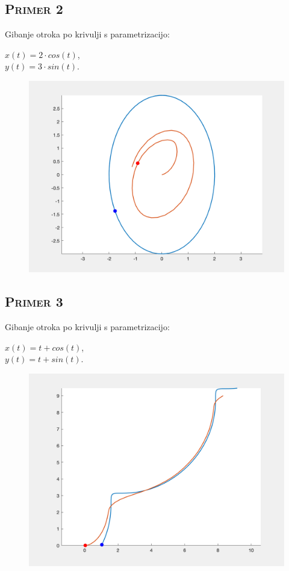 \documentclass[a4paper,12pt]{article}
\begin{document}
    \subsection{\textsc{Primer 2}}
     Gibanje otroka po krivulji s parametrizacijo:
    \begin{center}
    $x(t) = 2 \cdot cos(t)$, \\
    $y(t) = 3 \cdot sin(t)$. 
    \end{center}  
    \begin{figure}[!h]
        \centering
        \includegraphics[scale=0.4]{Primer6}
    \end{figure}

   
    \subsection{\textsc{Primer 3}}
     Gibanje otroka po krivulji s parametrizacijo:
    \begin{center}
    $x(t) = t + cos(t)$, \\
    $y(t) = t + sin(t)$. 
    \end{center}      
    \begin{figure}[!h]
        \centering
        \includegraphics[scale=0.4]{Primer2}
    \end{figure}
\end{document}
